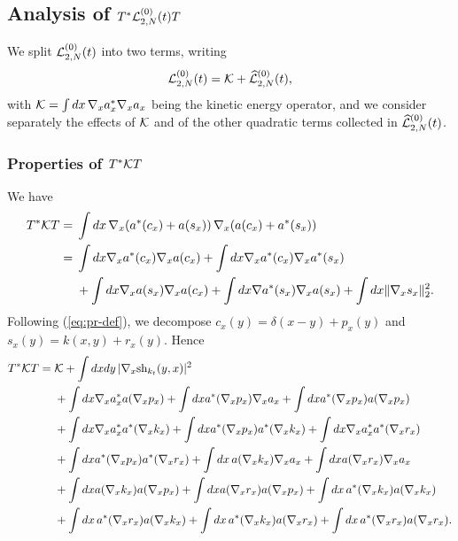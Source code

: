 \documentclass[11pt,a4paper]{article}
\newcommand{\cK}{{\cal K}}
\newcommand{\cL}{{\cal L}}
\begin{document}
\subsection{Analysis of $T^* \cL_{2,N}^{(0)} (t) T$}

We split $\cL_{2,N}^{(0)} (t)$ into two terms, writing \[\cL_{2,N}^{(0)} (t) = \cK + \widehat{\cL}_{2,N}^{(0)} (t),\] with $\cK = \int dx \, \nabla_x a^*_x \nabla_x a_x$ being the kinetic energy operator, and we consider separately the effects of $\cK$ 
and of the other quadratic terms collected in $\widehat{\cL}_{2,N}^{(0)} (t)$. 

\subsubsection{Properties of $T^* \cK T$}

We have
\[ \begin{split} T^* \cK T = \; & \int dx \, \nabla_x (a^* (c_x) + a(s_x)) \, \nabla_x (a(c_x) + a^* (s_x)) \\
= \; & \int dx \nabla_x a^* (c_x) \nabla_x a(c_x) + \int dx \nabla_x a^* (c_x) \nabla_x a^* (s_x) \\ & + \int dx \nabla_x a(s_x) \nabla_x a(c_x) + \int dx \nabla a^* (s_x) \nabla_x a (s_x) + \int dx  \| \nabla_x s_x \|_2^2.
\end{split} \]
Following (\ref{eq:pr-def}), we decompose  $c_x (y) = \delta (x-y) + p_x (y)$ and $s_x (y) = k (x,y) + r_x (y)$. Hence
\begin{equation}\label{eq:TKT} 
\begin{split} 
T^* \cK T = \; & \cK + \int dx dy \, | \nabla_x \text{sh}_{k_t} (y,x)|^2 \\  & + \int dx \nabla_x a^*_x a (\nabla_x p_x) + \int dx a^* (\nabla_x p_x) \nabla_x a_x + \int dx a^* (\nabla_x p_x) a (\nabla_x p_x)  \\ &+ \int dx \nabla_x a_x^* a^* (\nabla_x k_x)  + \int dx a^* (\nabla_x p_x) a^* (\nabla_x k_x) +  \int dx \nabla_x a_x^* a^* (\nabla_x r_x)  \\ & + \int dx a^* (\nabla_x p_x) a^* (\nabla_x r_x) + \int dx \, a(\nabla_x k_x) \nabla_x a_x + \int dx a(\nabla_x r_x) \nabla_x a_x  \\ & + \int dx a(\nabla_x k_x) a (\nabla_x p_x) + \int dx a(\nabla_x r_x) a(\nabla_x p_x) + \int dx \, a^* (\nabla_x k_x) a (\nabla_x k_x)  \\ & + \int dx \, a^* (\nabla_x r_x) a (\nabla_x k_x) + \int dx \, a^* (\nabla_x k_x) a(\nabla_x r_x) + \int dx \, a^* (\nabla_x r_x) a(\nabla_x r_x). 
\end{split} 
\end{equation}
\end{document}

